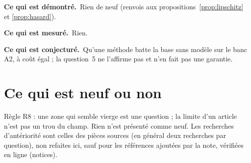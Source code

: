 \documentclass[11pt,a4paper]{article}
\theoremstyle{definition}
\theoremstyle{plain}
\newcommand{\demontre}{\par\noindent\textbf{Ce qui est démontré.}~}
\newcommand{\mesure}{\par\smallskip\noindent\textbf{Ce qui est mesuré.}~}
\newcommand{\conjecture}{\par\smallskip\noindent\textbf{Ce qui est conjecturé.}~}
\begin{document}
\begin{statuts}
\demontre Rien de neuf (renvois aux propositions~\ref{prop:lipschitz} et \ref{prop:hasard}).
\mesure Rien.
\conjecture Qu'une méthode batte la base sans modèle sur le banc A2, à coût égal ; la question~5 ne
l'affirme pas et n'en fait pas une garantie.
\end{statuts}

\section{Ce qui est neuf ou non}
\label{sec:neuf}

Règle R8 : une zone qui semble vierge est une question ; la limite d'un article n'est pas un trou du
champ. Rien n'est présenté comme neuf. Les recherches d'antériorité sont celles des pièces sources
(en général deux recherches par question), non refaites ici, sauf pour les références ajoutées par
la note, vérifiées en ligne (notices).
\end{document}

